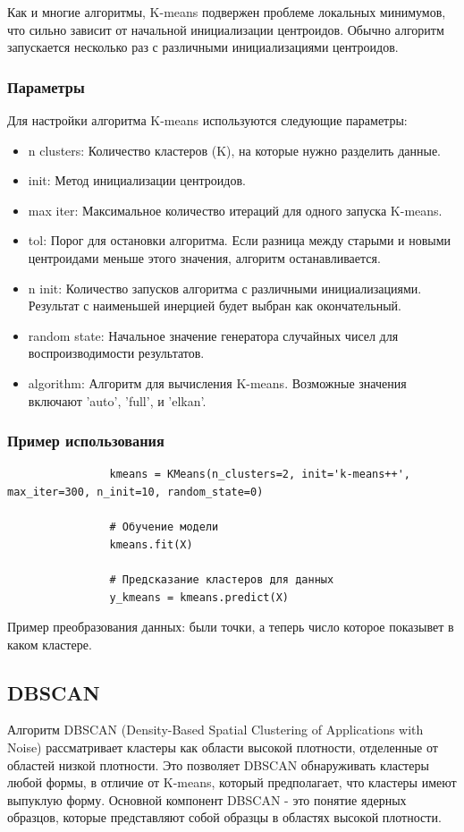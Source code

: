 			Как и многие алгоритмы, K-means подвержен проблеме локальных минимумов, что сильно зависит от начальной инициализации центроидов. Обычно алгоритм запускается несколько раз с различными инициализациями центроидов.
			
		\subsubsection{Параметры}
			Для настройки алгоритма K-means используются следующие параметры:
			\begin{itemize}
				\item n clusters: Количество кластеров (K), на которые нужно разделить данные.
				\item init: Метод инициализации центроидов.
				\item max iter: Максимальное количество итераций для одного запуска K-means.
				\item tol: Порог для остановки алгоритма. Если разница между старыми и новыми центроидами меньше этого значения, алгоритм останавливается.
				\item n init: Количество запусков алгоритма с различными инициализациями. Результат с наименьшей инерцией будет выбран как окончательный.
				\item random state: Начальное значение генератора случайных чисел для воспроизводимости результатов.
				\item algorithm: Алгоритм для вычисления K-means. Возможные значения включают 'auto', 'full', и 'elkan'.
			\end{itemize}
			
		\subsubsection{Пример использования}
			\begin{verbatim}
				kmeans = KMeans(n_clusters=2, init='k-means++', max_iter=300, n_init=10, random_state=0)

				# Обучение модели
				kmeans.fit(X)

				# Предсказание кластеров для данных
				y_kmeans = kmeans.predict(X)
			\end{verbatim}
			
			
			Пример преобразования данных:
				были точки, а теперь число которое показывет в каком кластере.
	  
	\subsection{DBSCAN}
		Алгоритм DBSCAN (Density-Based Spatial Clustering of Applications with Noise) рассматривает кластеры как области высокой плотности, отделенные от областей низкой плотности. Это позволяет DBSCAN обнаруживать кластеры любой формы, в отличие от K-means, который предполагает, что кластеры имеют выпуклую форму. Основной компонент DBSCAN - это понятие ядерных образцов, которые представляют собой образцы в областях высокой плотности.
		
